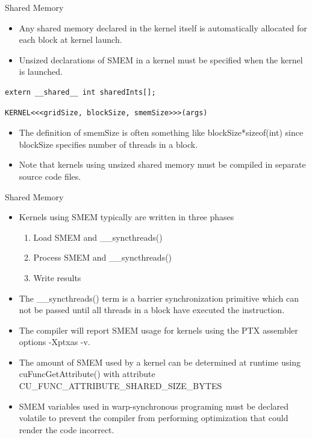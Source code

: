 \documentclass[handout]{beamer}
\begin{document}
\begin{frame}[fragile]{Shared Memory}
\begin{itemize}
	\item<1->Any shared memory declared in the kernel itself is automatically allocated for each block at kernel launch.
	\item<1->Unsized declarations of SMEM in a kernel must be specified when the kernel is launched.
\end{itemize}
\begin{lstlisting}[caption={Unsized declaration of SMEM}]
    extern __shared__ int sharedInts[];
\end{lstlisting}
\begin{lstlisting}[caption={Kernel launch syntax specifying size of SMEM}]
    KERNEL<<<gridSize, blockSize, smemSize>>>(args)
\end{lstlisting}
\begin{itemize}
	\item<1->The definition of {\selectfont smemSize} is often something like {\selectfont blockSize*sizeof(int)} since {\selectfont blockSize} specifies number of threads in a block.
	\item<1->Note that kernels using unsized shared memory must be compiled in separate source code files.
\end{itemize}
\end{frame}

\begin{frame}[fragile]{Shared Memory}
\begin{itemize}
	\item<1->Kernels using SMEM typically are written in three phases
	\begin{enumerate}
		\item<1->Load SMEM and {\selectfont \_\_syncthreads()}
		\item<1->Process SMEM and {\selectfont \_\_syncthreads()}
		\item<1->Write results
	\end{enumerate}
	\item<1->The {\selectfont \_\_syncthreads()} term is a barrier synchronization primitive which can not be passed until all threads in a block have executed the instruction.
	\item<1->The compiler will report SMEM usage for kernels using the PTX assembler options {\selectfont -Xptxas -v}.
	\item<1->The amount of SMEM used by a kernel can be determined at runtime using  {\selectfont cuFuncGetAttribute()} with attribute {\selectfont CU\_FUNC\_ATTRIBUTE\_SHARED\_SIZE\_BYTES}
	\item<1->SMEM variables used in warp-synchronous programing must be declared {\selectfont volatile} to prevent the compiler from performing optimization that could render the code incorrect.
\end{itemize}
\end{frame}
\end{document}

